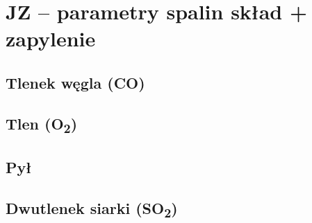 \section{JZ – parametry spalin skład + zapylenie}

\subsection{Tlenek węgla (CO)}

\subsection{Tlen (O\protect\textsubscript{2})}

\subsection{Pył}

\subsection{Dwutlenek siarki (SO\protect\textsubscript{2})}